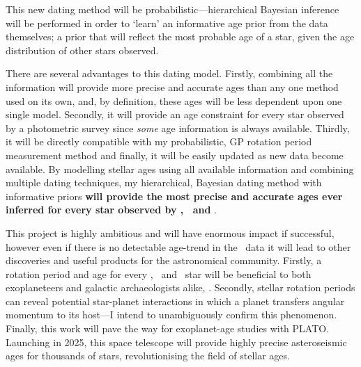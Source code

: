This new dating method will be probabilistic---hierarchical Bayesian inference
will be performed in order to `learn' an informative age prior from the data
themselves; a prior that will reflect the most probable age of a star, given
the age distribution of other stars observed.

There are several advantages to this dating model.
Firstly, combining all the information will provide more precise and accurate
ages than any one method used on its own, and, by definition, these ages will
be less dependent upon one single model.
Secondly, it will provide an age constraint for every star observed by
a photometric survey since {\it some} age information is always available.
Thirdly, it will be directly compatible with my probabilistic, GP rotation
period measurement method and finally, it will be easily updated as new data
become available.
By modelling stellar ages using all available information and combining
multiple dating techniques, my hierarchical, Bayesian dating method with
informative priors {\bf will provide the most precise and accurate ages ever
inferred for every star observed by \Kepler, \Ktwo\ and \TESS}.

This project is highly ambitious and will have enormous impact if successful,
however even if there is no detectable age-trend in the \Kepler\ data it will
lead to other discoveries and useful products for the astronomical
community.
Firstly, a rotation period and age for every \Kepler, \Ktwo\ and \TESS\ star
will be beneficial to both exoplaneteers and galactic archaeologists alike,
\citep[e.g.][]{bovy}.
Secondly, stellar rotation periods can reveal potential star-planet
interactions in which a planet transfers angular momentum to its host---I
intend to unambiguously confirm this phenomenon.
Finally, this work will pave the way for exoplanet-age studies with PLATO.
Launching in 2025, this space telescope will provide highly precise
asteroseismic ages for thousands of stars, revolutionising the field of
stellar ages.

